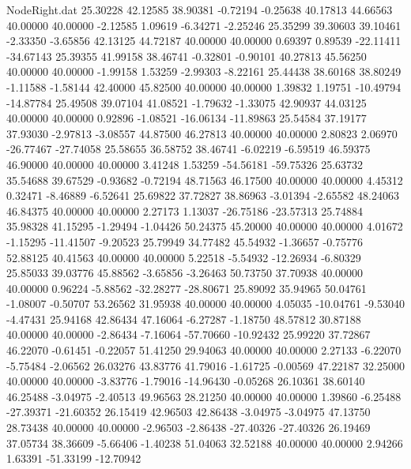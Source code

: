 \begin{filecontents}{NodeRight.dat}
  25.30228   42.12585   38.90381    -0.72194   -0.25638   40.17813   44.66563   40.00000   40.00000   -2.12585    1.09619   -6.34271   -2.25246
  25.35299   39.30603   39.10461    -2.33350   -3.65856   42.13125   44.72187   40.00000   40.00000    0.69397    0.89539  -22.11411  -34.67143
  25.39355   41.99158   38.46741    -0.32801   -0.90101   40.27813   45.56250   40.00000   40.00000   -1.99158    1.53259   -2.99303   -8.22161
  25.44438   38.60168   38.80249    -1.11588   -1.58144   42.40000   45.82500   40.00000   40.00000    1.39832    1.19751  -10.49794  -14.87784
  25.49508   39.07104   41.08521    -1.79632   -1.33075   42.90937   44.03125   40.00000   40.00000    0.92896   -1.08521  -16.06134  -11.89863
  25.54584   37.19177   37.93030    -2.97813   -3.08557   44.87500   46.27813   40.00000   40.00000    2.80823    2.06970  -26.77467  -27.74058
  25.58655   36.58752   38.46741    -6.02219   -6.59519   46.59375   46.90000   40.00000   40.00000    3.41248    1.53259  -54.56181  -59.75326
  25.63732   35.54688   39.67529    -0.93682   -0.72194   48.71563   46.17500   40.00000   40.00000    4.45312    0.32471   -8.46889   -6.52641
  25.69822   37.72827   38.86963    -3.01394   -2.65582   48.24063   46.84375   40.00000   40.00000    2.27173    1.13037  -26.75186  -23.57313
  25.74884   35.98328   41.15295    -1.29494   -1.04426   50.24375   45.20000   40.00000   40.00000    4.01672   -1.15295  -11.41507   -9.20523
  25.79949   34.77482   45.54932    -1.36657   -0.75776   52.88125   40.41563   40.00000   40.00000    5.22518   -5.54932  -12.26934   -6.80329
  25.85033   39.03776   45.88562    -3.65856   -3.26463   50.73750   37.70938   40.00000   40.00000    0.96224   -5.88562  -32.28277  -28.80671
  25.89092   35.94965   50.04761    -1.08007   -0.50707   53.26562   31.95938   40.00000   40.00000    4.05035  -10.04761   -9.53040   -4.47431
  25.94168   42.86434   47.16064    -6.27287   -1.18750   48.57812   30.87188   40.00000   40.00000   -2.86434   -7.16064  -57.70660  -10.92432
  25.99220   37.72867   46.22070    -0.61451   -0.22057   51.41250   29.94063   40.00000   40.00000    2.27133   -6.22070   -5.75484   -2.06562
  26.03276   43.83776   41.79016    -1.61725   -0.00569   47.22187   32.25000   40.00000   40.00000   -3.83776   -1.79016  -14.96430   -0.05268
  26.10361   38.60140   46.25488    -3.04975   -2.40513   49.96563   28.21250   40.00000   40.00000    1.39860   -6.25488  -27.39371  -21.60352
  26.15419   42.96503   42.86438    -3.04975   -3.04975   47.13750   28.73438   40.00000   40.00000   -2.96503   -2.86438  -27.40326  -27.40326
  26.19469   37.05734   38.36609    -5.66406   -1.40238   51.04063   32.52188   40.00000   40.00000    2.94266    1.63391  -51.33199  -12.70942

\end{filecontents}
